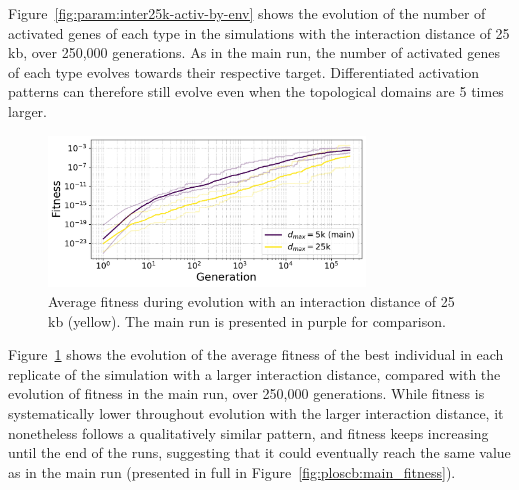 Figure~\ref{fig:param:inter25k-activ-by-env} shows the evolution of the number of activated genes of each type in the simulations with the interaction distance of 25 kb, over 250,000 generations.
As in the main run, the number of activated genes of each type evolves towards their respective target.
Differentiated activation patterns can therefore still evolve even when the topological domains are 5 times larger.

\begin{figure}[H]
\centering
\includegraphics[width=0.75\textwidth]{param/interaction-25k/fitness_all_with_main.pdf}
\caption[Average fitness during evolution, with an interaction distance of 25 kb]{Average fitness during evolution with an interaction distance of 25 kb (yellow).
The main run is presented in purple for comparison.}
\label{fig:param:inter25k-fitness}
\end{figure}

Figure~\ref{fig:param:inter25k-fitness} shows the evolution of the average fitness of the best individual in each replicate of the simulation with a larger interaction distance, compared with the evolution of fitness in the main run, over 250,000 generations.
While fitness is systematically lower throughout evolution with the larger interaction distance, it nonetheless follows a qualitatively similar pattern, and fitness keeps increasing until the end of the runs, suggesting that it could eventually reach the same value as in the main run (presented in full in Figure~\ref{fig:ploscb:main_fitness}).

